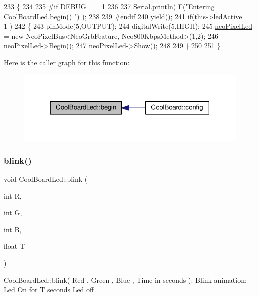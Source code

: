 \begin{DoxyCode}
233 \{
234 
235 \textcolor{preprocessor}{#if DEBUG == 1}
236 
237     Serial.println( F(\textcolor{stringliteral}{"Entering CoolBoardLed.begin() "}) );
238 
239 \textcolor{preprocessor}{#endif}
240     yield();
241     \textcolor{keywordflow}{if}(this->\hyperlink{classCoolBoardLed_a5f17c135516fcf4b44ea8a096ba0177a}{ledActive} == 1 )
242     \{
243         pinMode(5,OUTPUT);
244         digitalWrite(5,HIGH);
245         \hyperlink{classCoolBoardLed_ac2c13fa462a010cd9242bf297c013923}{neoPixelLed} = \textcolor{keyword}{new} NeoPixelBus<NeoGrbFeature, Neo800KbpsMethod>(1,2); 
246         \hyperlink{classCoolBoardLed_ac2c13fa462a010cd9242bf297c013923}{neoPixelLed}->Begin();
247         \hyperlink{classCoolBoardLed_ac2c13fa462a010cd9242bf297c013923}{neoPixelLed}->Show();
248 
249     \}
250 
251 \} 
\end{DoxyCode}
Here is the caller graph for this function\+:\nopagebreak
\begin{figure}[H]
\begin{center}
\leavevmode
\includegraphics[width=318pt]{classCoolBoardLed_ae3cbde8affcc6f011cbd698c8ef911f6_icgraph}
\end{center}
\end{figure}
\mbox{\label{classCoolBoardLed_a96e1ea13003eee34c9dbcef340404426}} 
\subsubsection{\texorpdfstring{blink()}{blink()}}
{\footnotesize\ttfamily void Cool\+Board\+Led\+::blink (\begin{DoxyParamCaption}\item[{int}]{R,  }\item[{int}]{G,  }\item[{int}]{B,  }\item[{float}]{T }\end{DoxyParamCaption})}

Cool\+Board\+Led\+::blink( Red , Green , Blue , Time in seconds )\+: Blink animation\+: Led On for T seconds Led off 

